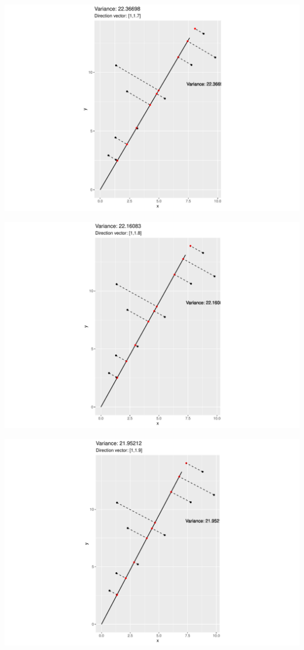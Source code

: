 \documentclass[
  ignorenonframetext,
]{beamer}
\begin{document}
\begin{frame}{}
\protect\hypertarget{section-17}{}
\includegraphics{note9_files/figure-beamer/unnamed-chunk-24-1.pdf}
\end{frame}

\begin{frame}{}
\protect\hypertarget{section-18}{}
\includegraphics{note9_files/figure-beamer/unnamed-chunk-25-1.pdf}
\end{frame}

\begin{frame}{}
\protect\hypertarget{section-19}{}
\includegraphics{note9_files/figure-beamer/unnamed-chunk-26-1.pdf}
\end{frame}
\end{document}
